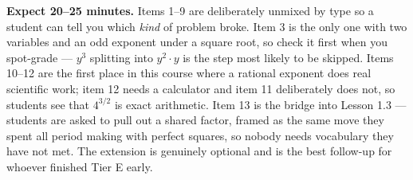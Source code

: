 \documentclass[10pt]{article}
\begin{document}
\begin{teachernote}[Homework]
    \textbf{Expect 20--25 minutes.} Items 1--9 are deliberately unmixed by type so a student can
    tell you which \emph{kind} of problem broke. Item 3 is the only one with two variables and an
    odd exponent under a square root, so check it first when you spot-grade --- $y^3$ splitting
    into $y^2\cdot y$ is the step most likely to be skipped. Items 10--12 are the first place in
    this course where a rational exponent does real scientific work; item 12 needs a calculator
    and item 11 deliberately does not, so students see that $4^{3/2}$ is exact arithmetic. Item 13
    is the bridge into Lesson 1.3 --- students are asked to pull out a shared factor, framed as
    the same move they spent all period making with perfect squares, so nobody needs vocabulary
    they have not met. The extension is genuinely optional and is the best follow-up for whoever
    finished Tier E early.
\end{teachernote}
\end{document}
